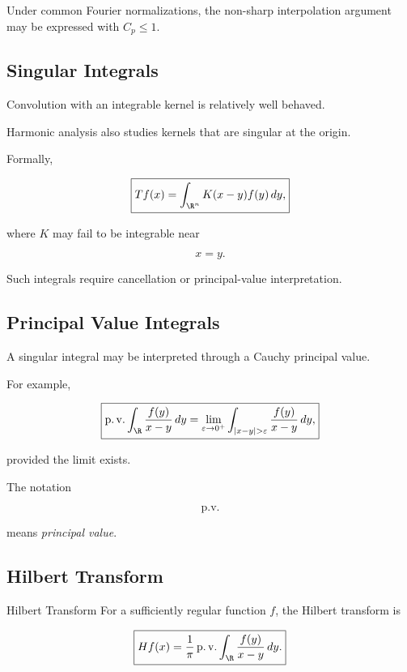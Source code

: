 Under common Fourier normalizations, the non-sharp interpolation argument
may be expressed with \(C_p\leq1\).

\subsection{Singular Integrals}
\label{subsec:singular-integrals}

Convolution with an integrable kernel is relatively well behaved.

Harmonic analysis also studies kernels that are singular at the origin.

Formally,

\[
\boxed{
Tf(x)
=
\int_{\R^n}
K(x-y)f(y)\,dy,
}
\]

where \(K\) may fail to be integrable near

\[
x=y.
\]

Such integrals require cancellation or principal-value interpretation.

\subsection{Principal Value Integrals}
\label{subsec:principal-value-integrals}

A singular integral may be interpreted through a Cauchy principal value.

For example,

\[
\boxed{
\operatorname{p.v.}
\int_{\R}
\frac{f(y)}{x-y}\,dy
=
\lim_{\varepsilon\to0^+}
\int_{|x-y|>\varepsilon}
\frac{f(y)}{x-y}\,dy,
}
\]

provided the limit exists.

The notation

\[
\operatorname{p.v.}
\]

means \emph{principal value}.

\subsection{Hilbert Transform}
\label{subsec:hilbert-transform}

\begin{definitionbox}{Hilbert Transform}
For a sufficiently regular function \(f\), the Hilbert transform is

\[
\boxed{
Hf(x)
=
\frac1\pi
\operatorname{p.v.}
\int_{\R}
\frac{f(y)}{x-y}\,dy.
}
\]
\end{definitionbox}

